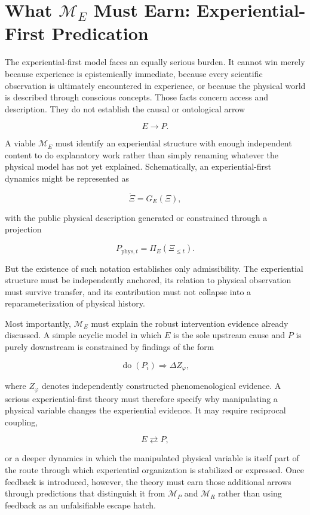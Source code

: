 \section{What $\mathcal M_E$ Must Earn: Experiential-First Predication}

The experiential-first model faces an equally serious burden. It cannot win merely because experience is epistemically immediate, because every scientific observation is ultimately encountered in experience, or because the physical world is described through conscious concepts. Those facts concern access and description. They do not establish the causal or ontological arrow

\[
E\longrightarrow P.
\]

A viable $\mathcal M_E$ must identify an experiential structure with enough independent content to do explanatory work rather than simply renaming whatever the physical model has not yet explained. Schematically, an experiential-first dynamics might be represented as

\[
\dot\Xi=G_E(\Xi),
\]

with the public physical description generated or constrained through a projection

\[
P_{\mathrm{phys},t}=\Pi_E(\Xi_{\le t}).
\]

But the existence of such notation establishes only admissibility. The experiential structure must be independently anchored, its relation to physical observation must survive transfer, and its contribution must not collapse into a reparameterization of physical history.

Most importantly, $\mathcal M_E$ must explain the robust intervention evidence already discussed. A simple acyclic model in which $E$ is the sole upstream cause and $P$ is purely downstream is constrained by findings of the form

\[
\operatorname{do}(P_i)\Rightarrow\Delta Z_\varphi,
\]

where $Z_\varphi$ denotes independently constructed phenomenological evidence. A serious experiential-first theory must therefore specify why manipulating a physical variable changes the experiential evidence. It may require reciprocal coupling,

\[
E\rightleftarrows P,
\]

or a deeper dynamics in which the manipulated physical variable is itself part of the route through which experiential organization is stabilized or expressed. Once feedback is introduced, however, the theory must earn those additional arrows through predictions that distinguish it from $\mathcal M_P$ and $\mathcal M_R$ rather than using feedback as an unfalsifiable escape hatch.

